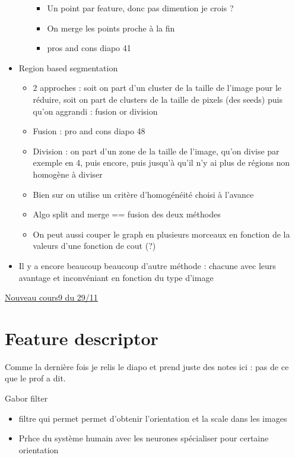 \documentclass{article}
\theoremstyle{plain}%
\theoremstyle{definition}
\theoremstyle{remark}
\begin{document}
\begin{itemize}
\begin{itemize}
\begin{itemize}
            \item Un point par feature, donc pas dimention je crois ? 
            \item On merge les points proche à la fin
            \item pros and cons diapo 41
        \end{itemize}
    \end{itemize}
    \item Region based segmentation
    \begin{itemize}
        \item 2 approches : soit on part d'un cluster de la taille de l'image pour le réduire, soit on part de clusters de la taille de pixels (des seeds) puis qu'on aggrandi : fusion or division
        \item Fusion : pro and cons diapo 48
        \item Division : on part d'un zone de la taille de l'image, qu'on divise par exemple en 4, puis encore, puis jusqu'à qu'il n'y ai plus de régions non homogène à diviser
        \item Bien sur on utilise un critère d'homogénéité choisi à l'avance 
        \item Algo split and merge == fusion des deux méthodes
        \item On peut aussi couper le graph en plusieurs morceaux en fonction de la valeurs d'une fonction de cout (?)
    \end{itemize}
    \item Il y a encore beaucoup beaucoup d'autre méthode : chacune avec leurs avantage et inconvéniant en fonction du type d'image 
\end{itemize}

\underline{Nouveau cours9 du 29/11} \\
\section{Feature descriptor}
Comme la dernière fois je relis le diapo et prend juste des notes ici : pas de ce que le prof a dit.

Gabor filter
\begin{itemize}
    \item filtre qui permet permet d'obtenir l'orientation et la scale dans les images
    \item Prhce du système humain avec les neurones spécialiser pour certaine orientation
\end{itemize}
\end{document}
